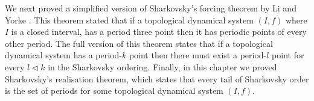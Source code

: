 \begin{center}
\end{center}
We next proved a simplified version of Sharkovsky's forcing theorem by Li and Yorke \cite{li-yorke}. This theorem stated that if a topological dynamical system $(I, f)$ where $I$ is a closed interval, has a period three point then it has periodic points of every other period. The full version of this theorem states that if a topological dynamical system has a period-$k$ point then there must exist a period-$l$ point for every $l \lhd k$ in the Sharkovsky ordering. Finally, in this chapter we proved Sharkovsky's realisation theorem, which states that every tail of Sharkovsky order is the set of periods for some topological dynamical system $(I, f)$. 

